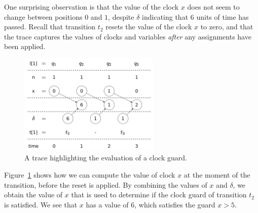 \documentclass[a4paper,11pt]{report}
\theoremstyle{definition}
\begin{document}
One surprising observation is that the value of the clock $x$ does not seem to
change between positions $0$ and $1$, despite $\delta$ indicating that $6$ units
of time has passed. Recall that transition $t_{2}$ resets the value of the clock
$x$ to zero, and that the trace captures the values of clocks and variables
\emph{after} any assignments have been applied.

\begin{figure}[h]
  \centering
  \includegraphics[width=0.6\textwidth]{trace-shift-delta}
  \caption{A trace highlighting the evaluation of a clock guard.}
  \label{fig:trace-delta}
\end{figure}

Figure~\ref{fig:trace-delta} shows how we can compute the value of clock $x$ at
the moment of the transition, before the reset is applied. By combining the
values of $x$ and $\delta$, we obtain the value of $x$ that is used to determine
if the clock guard of transition $t_{2}$ is satisfied. We see that $x$ has a
value of 6, which satisfies the guard $x>5$.
\end{document}
